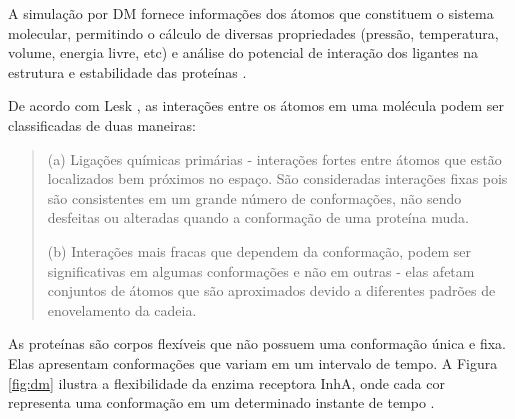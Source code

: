 A simulação por DM fornece informações dos átomos que constituem o sistema molecular, permitindo o cálculo de diversas propriedades (pressão, temperatura, volume, energia livre, etc) e análise do potencial de interação dos ligantes na estrutura e estabilidade das proteínas \cite{kar11}.

De acordo com Lesk \cite{art08}, as interações entre os átomos em uma molécula podem ser classificadas de duas maneiras:

\begin{quote}
	(a) Ligações químicas primárias - interações fortes entre átomos que estão localizados bem próximos no espaço. São consideradas interações fixas pois são consistentes em um grande número de conformações, não sendo desfeitas ou alteradas quando a conformação de uma proteína muda. 

	(b) Interações mais fracas que dependem da conformação, podem ser significativas em algumas conformações e não em outras - elas afetam conjuntos de átomos que são aproximados devido a diferentes padrões de enovelamento da cadeia.
\end{quote}

As proteínas são corpos flexíveis que não possuem uma conformação única e fixa. Elas apresentam conformações que variam em um intervalo de tempo. A Figura \ref{fig:dm} ilustra a flexibilidade da enzima receptora InhA, onde cada cor representa uma conformação em um determinado instante de tempo \cite{COH10}.


